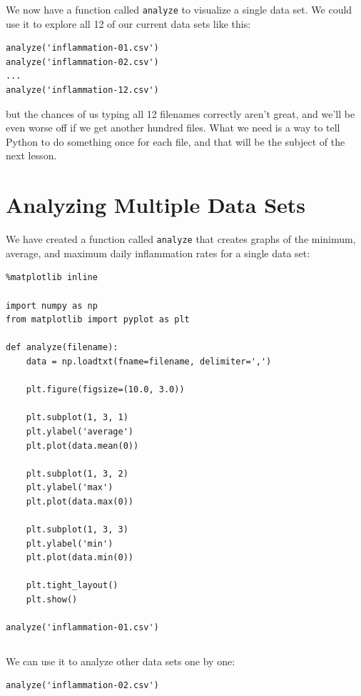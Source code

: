 \documentclass[]{book}
\begin{document}
We now have a function called \texttt{analyze} to visualize a single
data set. We could use it to explore all 12 of our current data sets
like this:

\begin{verbatim}
analyze('inflammation-01.csv')
analyze('inflammation-02.csv')
...
analyze('inflammation-12.csv')
\end{verbatim}

but the chances of us typing all 12 filenames correctly aren't great,
and we'll be even worse off if we get another hundred files. What we
need is a way to tell Python to do something once for each file, and
that will be the subject of the next lesson.

\section{Analyzing Multiple Data Sets}

We have created a function called \texttt{analyze} that creates graphs
of the minimum, average, and maximum daily inflammation rates for a
single data set:

\begin{verbatim}
%matplotlib inline

import numpy as np
from matplotlib import pyplot as plt

def analyze(filename):
    data = np.loadtxt(fname=filename, delimiter=',')

    plt.figure(figsize=(10.0, 3.0))

    plt.subplot(1, 3, 1)
    plt.ylabel('average')
    plt.plot(data.mean(0))

    plt.subplot(1, 3, 2)
    plt.ylabel('max')
    plt.plot(data.max(0))

    plt.subplot(1, 3, 3)
    plt.ylabel('min')
    plt.plot(data.min(0))

    plt.tight_layout()
    plt.show()

analyze('inflammation-01.csv')
\end{verbatim}

\begin{verbatim}
\end{verbatim}

We can use it to analyze other data sets one by one:

\begin{verbatim}
analyze('inflammation-02.csv')
\end{verbatim}

\begin{verbatim}
\end{verbatim}
\end{document}
